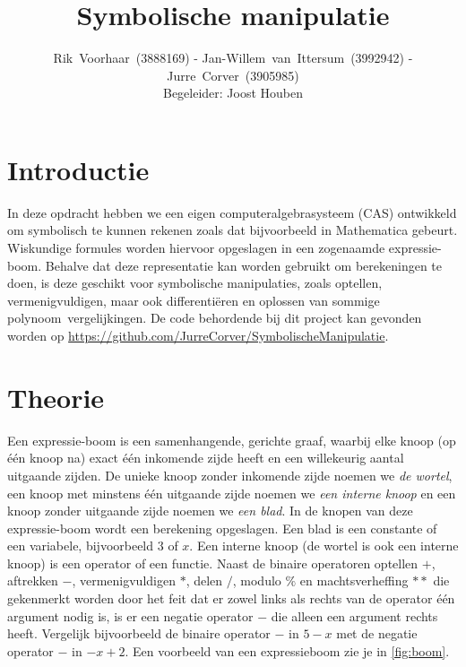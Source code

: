 \documentclass[a4paper]{article}
\title{Symbolische manipulatie}
\author{Rik~Voorhaar~(3888169) - Jan-Willem~van~Ittersum~(3992942) - Jurre~Corver~(3905985)\\
Begeleider: Joost Houben}
\begin{document}
\maketitle
\clearpage


\section{Introductie}
In deze opdracht hebben we een eigen computeralgebrasysteem (CAS) ontwikkeld om symbolisch te kunnen rekenen zoals dat bijvoorbeeld in Mathematica gebeurt. Wiskundige formules worden hiervoor opgeslagen in een zogenaamde expressie-boom. Behalve dat deze representatie kan worden gebruikt om berekeningen te doen, is deze geschikt voor symbolische manipulaties, zoals optellen, vermenigvuldigen, maar ook differenti\"eren en oplossen van sommige polynoom~vergelijkingen. De code behordende bij dit project kan gevonden worden op \url{https://github.com/JurreCorver/SymbolischeManipulatie}.


\section{Theorie}
Een expressie-boom is een samenhangende, gerichte graaf, waarbij elke knoop (op \'e\'en knoop na) exact \'e\'en inkomende zijde heeft en een willekeurig aantal uitgaande zijden. De unieke knoop zonder inkomende zijde noemen we \textit{de wortel}, een knoop met minstens \'e\'en uitgaande zijde noemen we \textit{een interne knoop} en een knoop zonder uitgaande zijde noemen we \textit{een blad}. In de knopen van deze expressie-boom wordt een berekening opgeslagen. Een blad is een constante of een variabele, bijvoorbeeld $3$ of $x$. Een interne knoop (de wortel is ook een interne knoop) is een operator of een functie. Naast de binaire operatoren optellen $+$, aftrekken $-$, vermenigvuldigen $*$, delen $/$, modulo $\%$ en machtsverheffing $**$ die gekenmerkt worden door het feit dat er zowel links als rechts van de operator \'e\'en argument nodig is, is er een negatie operator $-$ die alleen een argument rechts heeft. Vergelijk bijvoorbeeld de binaire operator $-$ in $5-x$ met de negatie operator $-$ in $-x+2$. Een voorbeeld van een expressieboom zie je in \ref{fig:boom}.
\end{document}
